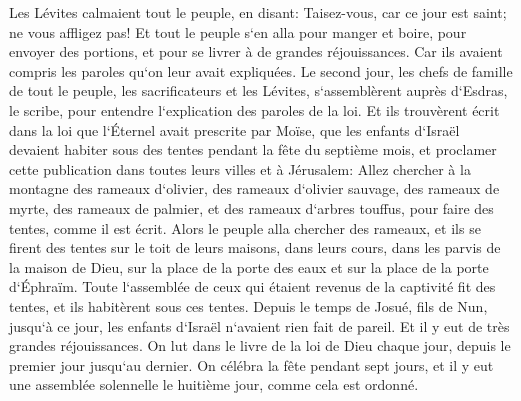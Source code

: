 \verse Les Lévites calmaient tout le peuple, en disant: Taisez-vous, car ce jour est saint; ne vous affligez pas! 
\verse Et tout le peuple s`en alla pour manger et boire, pour envoyer des portions, et pour se livrer à de grandes réjouissances. Car ils avaient compris les paroles qu`on leur avait expliquées. 
\verse Le second jour, les chefs de famille de tout le peuple, les sacrificateurs et les Lévites, s`assemblèrent auprès d`Esdras, le scribe, pour entendre l`explication des paroles de la loi. 
\verse Et ils trouvèrent écrit dans la loi que l`Éternel avait prescrite par Moïse, que les enfants d`Israël devaient habiter sous des tentes pendant la fête du septième mois, 
\verse et proclamer cette publication dans toutes leurs villes et à Jérusalem: Allez chercher à la montagne des rameaux d`olivier, des rameaux d`olivier sauvage, des rameaux de myrte, des rameaux de palmier, et des rameaux d`arbres touffus, pour faire des tentes, comme il est écrit. 
\verse Alors le peuple alla chercher des rameaux, et ils se firent des tentes sur le toit de leurs maisons, dans leurs cours, dans les parvis de la maison de Dieu, sur la place de la porte des eaux et sur la place de la porte d`Éphraïm. 
\verse Toute l`assemblée de ceux qui étaient revenus de la captivité fit des tentes, et ils habitèrent sous ces tentes. Depuis le temps de Josué, fils de Nun, jusqu`à ce jour, les enfants d`Israël n`avaient rien fait de pareil. Et il y eut de très grandes réjouissances. 
\verse On lut dans le livre de la loi de Dieu chaque jour, depuis le premier jour jusqu`au dernier. On célébra la fête pendant sept jours, et il y eut une assemblée solennelle le huitième jour, comme cela est ordonné. 

